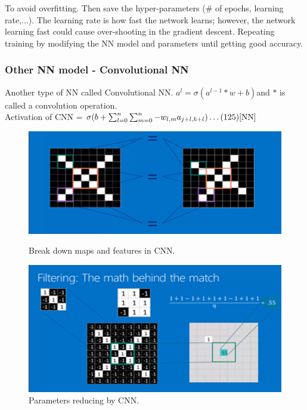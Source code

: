 \documentclass{article}
\begin{document}
To avoid overfitting. Then save the hyper-parameters (\# of epochs, learning rate,...). The learning rate is how fast the network learns; however, the network learning fast could cause over-shooting in the gradient descent.
Repeating training by modifying the NN model and parameters until getting good accuracy.

\subsubsection{Other NN model - Convolutional NN}

Another type of NN called Convolutional NN. $a^l=\sigma{(a^{l-1}*w+b)}$and $\ast$ is called a convolution operation.
\\Activation of CNN = $\sigma{(b+\sum_{l=0}^{n}\sum_{m=0}^{n}-w_{l,m}a_{j+l,k+l})} \dots  (125)\cite{NN}$
\begin{figure}[H]
  \centering
  \begin{minipage}[b]{0.6\textwidth}
    \includegraphics[width=\textwidth]{img/convol.png}
    \caption{Break down maps and features in CNN.\protect\cite{CON}}
    \label{over}
  \end{minipage}
  \hfill
  \begin{minipage}[b]{0.6\textwidth}
    \includegraphics[width=\textwidth]{img/convol1.png}
    \caption{Parameters reducing by CNN.\protect\cite{CON}}
    \label{over1}
  \end{minipage}
\end{figure}
\end{document}
